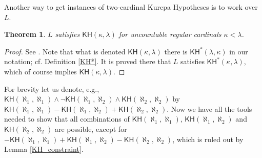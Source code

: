 \documentclass[10pt,reqno]{amsart}
\theoremstyle{plain}
\newtheorem{theorem}{Theorem}[section]
\theoremstyle{definition}
\theoremstyle{remark}
\begin{document}
Another way to get instances of two-cardinal Kurepa Hypotheses is to work over $L$.

\begin{theorem}
\label{KH_L}
$L$ satisfies $\mathsf{KH}(\kappa,\lambda)$ for uncountable regular cardinals $\kappa<\lambda$.
\end{theorem}
\begin{proof}
See \cite[Chapter VII Section 3]{devlin2017constructibility}. Note that what is denoted $\mathsf{KH}(\kappa,\lambda)$ there is $\mathsf{KH}^*(\lambda,\kappa)$ in our notation; cf. Definition \ref{KH*}. It is proved there that $L$ satisfies $\mathsf{KH}^*(\kappa,\lambda)$, which of course implies $\mathsf{KH}(\kappa,\lambda)$.
\end{proof}



For brevity let us denote, e.g., $\mathsf{KH}(\aleph_1,\aleph_1)\land\lnot\mathsf{KH}(\aleph_1,\aleph_2)\land\mathsf{KH}(\aleph_2,\aleph_2)$ by $\mathsf{KH}(\aleph_1,\aleph_1)-\mathsf{KH}(\aleph_1,\aleph_2)+\mathsf{KH}(\aleph_2,\aleph_2)$. Now we have all the tools needed to show that all combinations of $\mathsf{KH}(\aleph_1,\aleph_1)$, $\mathsf{KH}(\aleph_1,\aleph_2)$ and $\mathsf{KH}(\aleph_2,\aleph_2)$ are possible, except for $-\mathsf{KH}(\aleph_1,\aleph_1)+\mathsf{KH}(\aleph_1,\aleph_2)-\mathsf{KH}(\aleph_2,\aleph_2)$, which is ruled out by Lemma \ref{KH_constraint}. 
\end{document}

